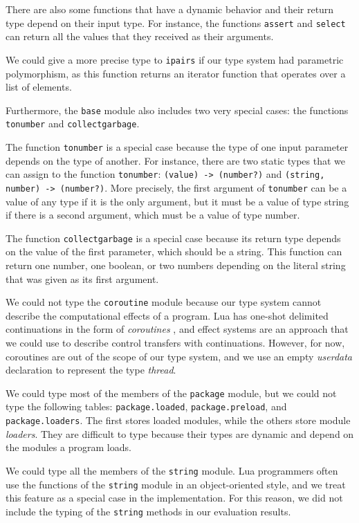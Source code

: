 There are also some functions that have a dynamic behavior and
their return type depend on their input type.
For instance, the functions \texttt{assert} and \texttt{select}
can return all the values that they received as their arguments.

We could give a more precise type to \texttt{ipairs} if our
type system had parametric polymorphism, as this function
returns an iterator function that operates over a list of
elements.

Furthermore, the \texttt{base} module also includes two very
special cases: the functions \texttt{tonumber} and \texttt{collectgarbage}.

The function \texttt{tonumber} is a special case because the
type of one input parameter depends on the type of another.
For instance, there are two static types that we can
assign to the function \texttt{tonumber}:
\texttt{(value) -> (number?)} and
\texttt{(string, number) -> (number?)}.
More precisely, the first argument of \texttt{tonumber} can be
a value of any type if it is the only argument, but it must
be a value of type string if there is a second argument,
which must be a value of type number.

The function \texttt{collectgarbage} is a special case because
its return type depends on the value of the first parameter,
which should be a string.
This function can return one number, one boolean, or two numbers
depending on the literal string that was given as its first argument.

We could not type the \texttt{coroutine} module because our
type system cannot describe the computational effects of a program.
Lua has one-shot delimited continuations \citep{james2011yield}
in the form of \emph{coroutines} \citep{moura2009rc}, and
effect systems \citep{nielson1999type} are an approach that we
could use to describe control transfers with continuations.
However, for now, coroutines are out of the scope of our type
system, and we use an empty \emph{userdata} declaration
to represent the type \emph{thread}.

We could type most of the members of the \texttt{package} module,
but we could not type the following tables: \texttt{package.loaded},
\texttt{package.preload}, and \texttt{package.loaders}.
The first stores loaded modules, while the others store module \emph{loaders}.
They are difficult to type because their types are dynamic and
depend on the modules a program loads.

We could type all the members of the \texttt{string} module.
Lua programmers often use the functions of the \texttt{string} module
in an object-oriented style, and we treat this feature as a
special case in the implementation.
For this reason, we did not include the typing of the \texttt{string}
methods in our evaluation results.

